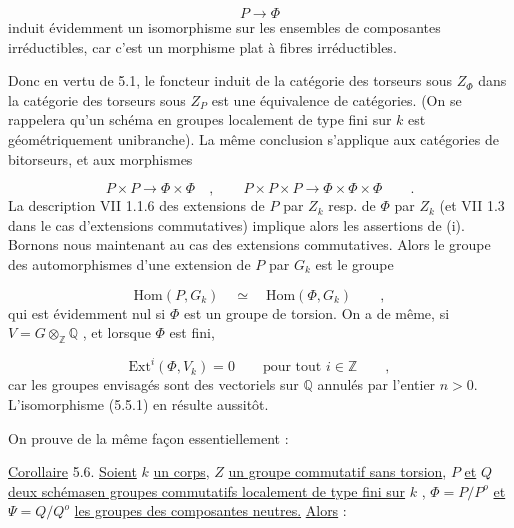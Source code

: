\begin{equation*}
P \longrightarrow \Phi
\end{equation*}
induit évidemment un isomorphisme sur les ensembles de composantes irréductibles, car c'est un morphisme plat à fibres irréductibles.



Donc en vertu de 5.1, le foncteur induit de la catégorie des torseurs sous $Z_{\Phi}$ dans la catégorie des torseurs sous $Z_{P}$ est une équivalence de catégories. (On se rappelera qu'un schéma en groupes localement de type fini sur $k$ est géométriquement unibranche). La même conclusion s'applique aux catégories de bitorseurs, et aux morphismes

\begin{equation*}
P \times P \longrightarrow \Phi \times \Phi \quad , \qquad P \times P \times P \longrightarrow \Phi \times \Phi \times \Phi \qquad .
\end{equation*}
La description VII 1.1.6 des extensions de $P$ par $Z_{k}$ resp. de $\Phi$ par $Z_{k}$ (et VII 1.3 dans le cas d'extensions commutatives) implique alors les assertions de (i). Bornons nous maintenant au cas des extensions commutatives. Alors le groupe des automorphismes d'une extension de $P$ par $G_{k}$ est le groupe

\begin{equation*}
\mathrm{Hom}(P,G_{k}) \quad \simeq \quad \mathrm{Hom}(\Phi,G_{k}) \qquad ,
\end{equation*}
qui est évidemment nul si $\Phi$ est un groupe de torsion. On a de même, si $V = G\otimes_{\mathbb{Z}}\mathbb{Q}$ , et lorsque $\Phi$ est fini,

\begin{equation*}
\mathrm{Ext}^{i}(\Phi,V_{k}) = 0 \qquad \text{pour tout } i \in \mathbb{Z} \qquad ,
\end{equation*}
car les groupes envisagés sont des vectoriels sur $\mathbb{Q}$ annulés par l'entier $n > 0$. L'isomorphisme (5.5.1) en résulte aussitôt.

On prouve de la même façon essentiellement :

\underline{Corollaire} 5.6. \underline{Soient} $k$ \underline{un corps}, $Z$ \underline{un groupe commutatif sans torsion}, $P$ \underline{et} $Q$ \underline{deux schémasen groupes commutatifs localement de type fini sur} $k$ , $\Phi = P/P^{o}$ \underline{et} $\Psi = Q/Q^{o}$ \underline{les groupes des composantes neutres.} \underline{Alors} :

